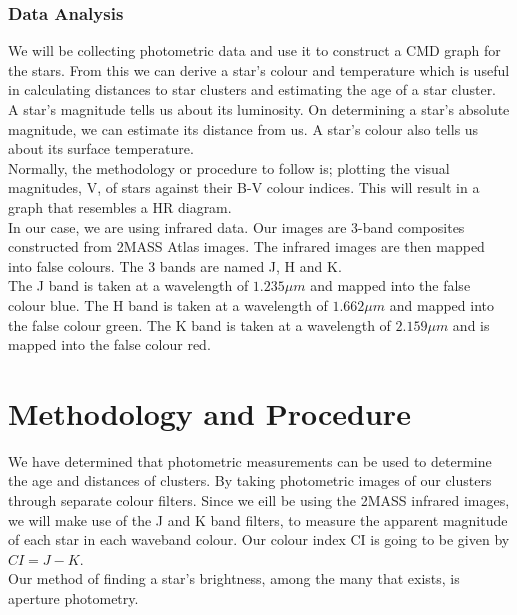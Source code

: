 \documentclass[12pt]{article}
\begin{document}
		
		\subsubsection{Data Analysis}
		We will be collecting photometric data and use it to construct a CMD graph for the stars. From this we can derive a star's colour and temperature which is useful in calculating distances to star clusters and estimating the age of a star cluster.\\
		A star's magnitude tells us about its luminosity. On determining a star's absolute magnitude, we can estimate its distance from us. A star's colour also tells us about its surface temperature.\\
		Normally, the methodology or procedure to follow is; plotting the visual magnitudes, V, of stars against their B-V colour indices. This will result in a graph that resembles a HR diagram.\\
		In our case, we are using infrared data. Our images are 3-band composites constructed from 2MASS Atlas images. The infrared images are then mapped into false colours. The 3 bands are named J, H and K.\\
		The J band is taken at a wavelength of $1.235\mu m$ and mapped into the false colour blue. The H band is taken at a wavelength of $1.662\mu m$ and mapped into the false colour green. The K band is taken at a wavelength of $2.159\mu m$ and is mapped into the false colour red.\\
		
	
	
	\section{Methodology and Procedure}
	We have determined that photometric measurements can be used to determine the age and distances of clusters. By taking photometric images of our clusters through separate colour filters. Since we eill be using the 2MASS infrared images, we will make use of the J and K band filters, to measure the apparent magnitude of each star in each waveband colour. Our colour index CI is going to be given by $CI = J - K$.\\
	Our method of finding a star's brightness, among the many that exists, is aperture photometry.
\end{document}
